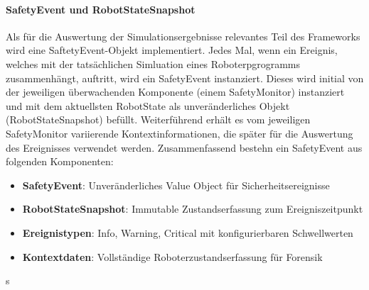 \paragraph{SafetyEvent und RobotStateSnapshot}
Als für die Auswertung der Simulationsergebnisse relevantes Teil des Frameworks
wird eine SaftetyEvent-Objekt implementiert. Jedes Mal, wenn ein Ereignis,
welches mit der tatsächlichen Simluation eines Roboterpgrogramms zusammenhängt,
auftritt, wird ein SafetyEvent instanziert. Dieses wird initial von der
jeweiligen überwachenden Komponente (einem SafetyMonitor) instanziert und mit
dem aktuellsten RobotState als unveränderliches Objekt (RobotStateSnapshot) befüllt.
Weiterführend erhält es vom jeweiligen SafetyMonitor variierende
Kontextinformationen, die später für die Auswertung des Ereignisses verwendet
werden. Zusammenfassend bestehn ein SafetyEvent aus folgenden Komponenten:
\begin{itemize}
	\item \textbf{SafetyEvent}: Unveränderliches Value Object für Sicherheitsereignisse
	\item \textbf{RobotStateSnapshot}: Immutable Zustandserfassung zum Ereigniszeitpunkt
	\item \textbf{Ereignistypen}: Info, Warning, Critical mit konfigurierbaren Schwellwerten
	\item \textbf{Kontextdaten}: Vollständige Roboterzustandserfassung für Forensik
\end{itemize}
\noindent


s
